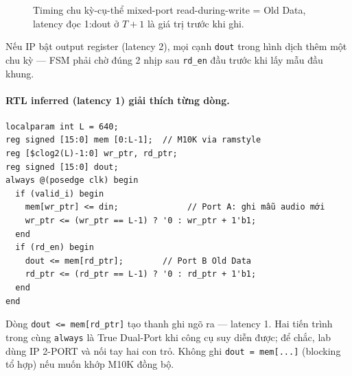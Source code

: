 \begin{figure}[H]
\centering
{}
\caption{Timing chu kỳ-cụ-thể mixed-port read-during-write = Old Data, latency đọc 1:dout ở $T{+}1$ là giá trị trước khi ghi.}
\label{fig:ch05_olddata_timing}
\end{figure}

Nếu IP bật output register (latency 2), mọi cạnh \texttt{dout} trong hình dịch thêm một chu kỳ --- FSM phải chờ đúng 2 nhịp sau \texttt{rd\_en} đầu trước khi lấy mẫu đầu khung.

\paragraph{RTL inferred (latency 1) giải thích từng dòng.}
\begin{verbatim}
localparam int L = 640;
reg signed [15:0] mem [0:L-1];  // M10K via ramstyle
reg [$clog2(L)-1:0] wr_ptr, rd_ptr;
reg signed [15:0] dout;
always @(posedge clk) begin
  if (valid_i) begin
    mem[wr_ptr] <= din;              // Port A: ghi mẫu audio mới
    wr_ptr <= (wr_ptr == L-1) ? '0 : wr_ptr + 1'b1;
  end
  if (rd_en) begin
    dout <= mem[rd_ptr];        // Port B Old Data
    rd_ptr <= (rd_ptr == L-1) ? '0 : rd_ptr + 1'b1;
  end
end
\end{verbatim}
Dòng \texttt{dout <= mem[rd\_ptr]} tạo thanh ghi ngõ ra --- latency 1. Hai tiến trình trong cùng \texttt{always} là True Dual-Port khi công cụ suy diễn được; để chắc, lab dùng IP 2-PORT và nối tay hai con trỏ. Không ghi \texttt{dout = mem[...]} (blocking tổ hợp) nếu muốn khớp M10K đồng bộ.

